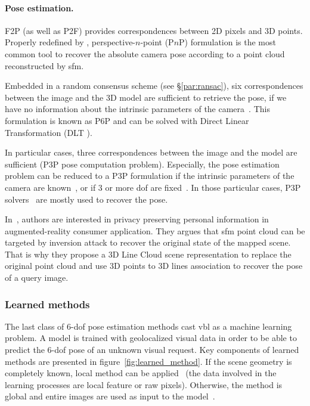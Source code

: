 \paragraph{Pose estimation.}
\label{para:pose_estimation}
F2P (as well as P2F) provides correspondences between 2D pixels and 3D points. Properly redefined by \citet{Hartley2003}, perspective-$n$-point (P$n$P) formulation is the most common tool to recover the absolute camera pose according to a point cloud reconstructed by \ac{sfm}.

Embedded in a random consensus scheme (see \S\ref{par:ransac}), six correspondences between the image and the 3D model are sufficient to retrieve the pose, if we have no information about the intrinsic parameters of the camera~\citep{Donoser2014,Li2010,Li2010,Heisterklaus2014}. This formulation is known as P6P and can be solved with Direct Linear Transformation (DLT \citep{Hartley2003}).

In particular cases, three correspondences between the image and the model are sufficient (P3P pose computation problem). Especially, the pose estimation problem can be reduced to a P3P formulation if the intrinsic parameters of the camera are known~\citep{Irschara2009,Middelberg2014}, or if 3 or more \ac{dof} are fixed~\citep{Zeisl2015,Qu2016,Svarm2016,Svarm2014}. In those particular cases, P3P solvers~\citet{Kneip2014opengv} are mostly used to recover the pose.

In~\citep{Speciale2019}, authors are interested in privacy preserving personal information in augmented-reality consumer application. They argues that \ac{sfm} point cloud can be targeted by inversion attack to recover the original state of the mapped scene. That is why they propose a 3D Line Cloud scene representation to replace the original point cloud and use 3D points to 3D lines association to recover the pose of a query image.

\subsubsection{Learned methods}


\label{subsubsec:pose_regression}
The last class of 6-\ac{dof} pose estimation methods cast \ac{vbl} as a machine learning problem. A model is trained with geolocalized visual data in order to be able to predict the 6-\ac{dof} pose of an unknown visual request. Key components of learned methods are presented in figure~\ref{fig:learned_method}. If the scene geometry is completely known, local method can be applied~\citep{Shotton2013} (\ie the data involved in the learning processes are local feature or raw pixels). Otherwise, the method is global and entire images are used as input to the model~\citep{Kendall2015}.

